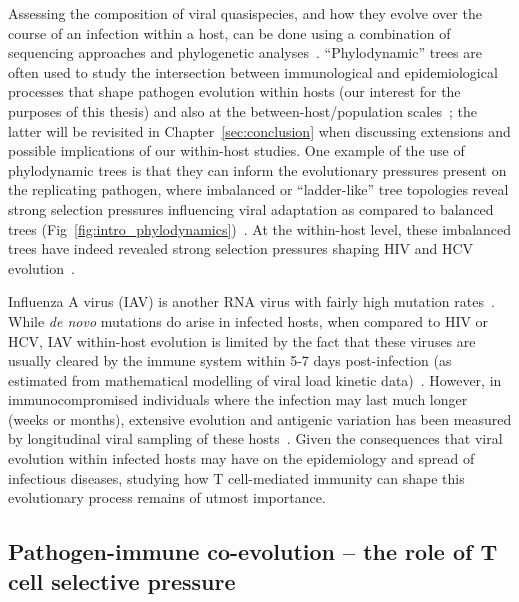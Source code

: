 Assessing the composition of viral quasispecies, and how they evolve over the course of an infection within a host, can be done using a combination of sequencing approaches and phylogenetic analyses~\cite{volz2013viral,lauring2020within}. ``Phylodynamic'' trees are often used to study the intersection between immunological and epidemiological processes that shape pathogen evolution within hosts (our interest for the purposes of this thesis) and also at the between-host/population scales~\cite{grenfell2004unifying,bons2018virus}; the latter will be revisited in Chapter~\ref{sec:conclusion} when discussing extensions and possible implications of our within-host studies. One example of the use of phylodynamic trees is that they can inform the evolutionary pressures present on the replicating pathogen, where imbalanced or ``ladder-like'' tree topologies reveal strong selection pressures influencing viral adaptation as compared to balanced trees (Fig~\ref{fig:intro_phylodynamics})~\cite{grenfell2004unifying,volz2013viral}. At the within-host level, these imbalanced trees have indeed revealed strong selection pressures shaping HIV and HCV evolution~\cite{grenfell2004unifying,raghwani2019high,lemey2006hiv}.

Influenza A virus (IAV) is another RNA virus with fairly high mutation rates~\cite{sanjuan2010viral}. While \textit{de novo} mutations do arise in infected hosts, when compared to HIV or HCV, IAV within-host evolution is limited by the fact that these viruses are usually cleared by the immune system within 5-7 days post-infection (as estimated from mathematical modelling of viral load kinetic data)~\cite{xue2018within,baccam2006kinetics}. However, in immunocompromised individuals where the infection may last much longer (weeks or months), extensive evolution and antigenic variation has been measured by longitudinal viral sampling of these hosts~\cite{rocha1991antigenic,mcminn1999antigenic,xue2017parallel}. Given the consequences that viral evolution within infected hosts may have on the epidemiology and spread of infectious diseases, studying how T cell-mediated immunity can shape this evolutionary process remains of utmost importance.

\subsection{Pathogen-immune co-evolution -- the role of T cell selective pressure}
\label{sec:intro_immuneEscape_RNAviruses}

